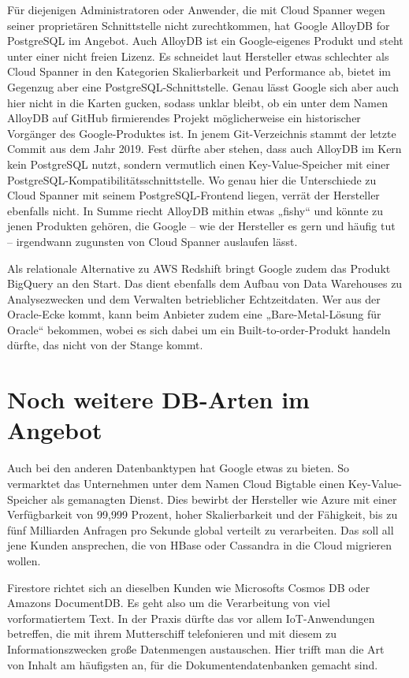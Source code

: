 Für diejenigen Administratoren oder Anwender, die mit Cloud Spanner wegen seiner proprietären Schnittstelle nicht zurechtkommen, hat Google AlloyDB for PostgreSQL im Angebot. Auch AlloyDB ist ein Google-eigenes Produkt und steht unter einer nicht freien Lizenz. Es schneidet laut Hersteller etwas schlechter als Cloud Spanner in den Kategorien Skalierbarkeit und Performance ab, bietet im Gegenzug aber eine PostgreSQL-Schnittstelle. Genau lässt Google sich aber auch hier nicht in die Karten gucken, sodass unklar bleibt, ob ein unter dem Namen AlloyDB auf GitHub firmierendes Projekt möglicherweise ein historischer Vorgänger des Google-Produktes ist. In jenem Git-Verzeichnis stammt der letzte Commit aus dem Jahr 2019. Fest dürfte aber stehen, dass auch AlloyDB im Kern kein PostgreSQL nutzt, sondern vermutlich einen Key-Value-Speicher mit einer PostgreSQL-Kompatibilitätsschnittstelle. Wo genau hier die Unterschiede zu Cloud Spanner mit seinem PostgreSQL-Frontend liegen, verrät der Hersteller ebenfalls nicht. In Summe riecht AlloyDB mithin etwas „fishy“ und könnte zu jenen Produkten gehören, die Google – wie der Hersteller es gern und häufig tut – irgendwann zugunsten von Cloud Spanner auslaufen lässt.

Als relationale Alternative zu AWS Redshift bringt Google zudem das Produkt BigQuery an den Start. Das dient ebenfalls dem Aufbau von Data Warehouses zu Analysezwecken und dem Verwalten betrieblicher Echtzeitdaten. Wer aus der Oracle-Ecke kommt, kann beim Anbieter zudem eine „Bare-Metal-Lösung für Oracle“ bekommen, wobei es sich dabei um ein Built-to-order-Produkt handeln dürfte, das nicht von der Stange kommt.

\section{Noch weitere DB-Arten im Angebot}

Auch bei den anderen Datenbanktypen hat Google etwas zu bieten. So vermarktet das Unternehmen unter dem Namen Cloud Bigtable einen Key-Value-Speicher als gemanagten Dienst. Dies bewirbt der Hersteller wie Azure mit einer Verfügbarkeit von 99,999 Prozent, hoher Skalierbarkeit und der Fähigkeit, bis zu fünf Milliarden Anfragen pro Sekunde global verteilt zu verarbeiten. Das soll all jene Kunden ansprechen, die von HBase oder Cassandra in die Cloud migrieren wollen.

Firestore richtet sich an dieselben Kunden wie Microsofts Cosmos DB oder Amazons DocumentDB. Es geht also um die Verarbeitung von viel vorformatiertem Text. In der Praxis dürfte das vor allem IoT-Anwendungen betreffen, die mit ihrem Mutterschiff telefonieren und mit diesem zu Informationszwecken große Datenmengen austauschen. Hier trifft man die Art von Inhalt am häufigsten an, für die Dokumentendatenbanken gemacht sind.

